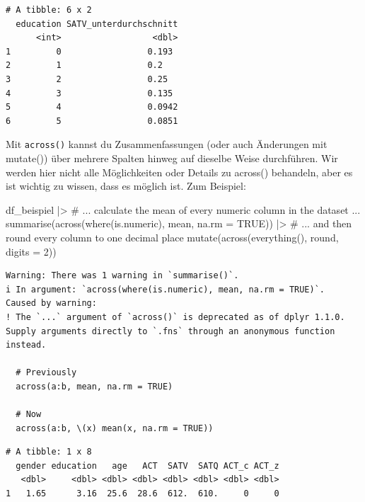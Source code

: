 \documentclass[
  letterpaper,
  DIV=11,
  numbers=noendperiod]{scrreprt}
\newenvironment{Shaded}{\begin{snugshade}}{\end{snugshade}}
\newcommand{\AttributeTok}[1]{\textcolor[rgb]{0.40,0.45,0.13}{#1}}
\newcommand{\CommentTok}[1]{\textcolor[rgb]{0.37,0.37,0.37}{#1}}
\newcommand{\ConstantTok}[1]{\textcolor[rgb]{0.56,0.35,0.01}{#1}}
\newcommand{\DecValTok}[1]{\textcolor[rgb]{0.68,0.00,0.00}{#1}}
\newcommand{\FunctionTok}[1]{\textcolor[rgb]{0.28,0.35,0.67}{#1}}
\newcommand{\NormalTok}[1]{\textcolor[rgb]{0.00,0.23,0.31}{#1}}
\newcommand{\SpecialCharTok}[1]{\textcolor[rgb]{0.37,0.37,0.37}{#1}}
\begin{document}
\begin{verbatim}
# A tibble: 6 x 2
  education SATV_unterdurchschnitt
      <int>                  <dbl>
1         0                 0.193 
2         1                 0.2   
3         2                 0.25  
4         3                 0.135 
5         4                 0.0942
6         5                 0.0851
\end{verbatim}

Mit \texttt{across()} kannst du Zusammenfassungen (oder auch Änderungen
mit mutate()) über mehrere Spalten hinweg auf dieselbe Weise
durchführen. Wir werden hier nicht alle Möglichkeiten oder Details zu
across() behandeln, aber es ist wichtig zu wissen, dass es möglich ist.
Zum Beispiel:

\begin{Shaded}
\begin{Highlighting}[]
\NormalTok{df\_beispiel }\SpecialCharTok{|\textgreater{}} 
  \CommentTok{\# ... calculate the mean of every numeric column in the dataset ...}
  \FunctionTok{summarise}\NormalTok{(}\FunctionTok{across}\NormalTok{(}\FunctionTok{where}\NormalTok{(is.numeric), mean, }\AttributeTok{na.rm =} \ConstantTok{TRUE}\NormalTok{)) }\SpecialCharTok{|\textgreater{}} 
  \CommentTok{\# ... and then round every column to one decimal place}
  \FunctionTok{mutate}\NormalTok{(}\FunctionTok{across}\NormalTok{(}\FunctionTok{everything}\NormalTok{(), round, }\AttributeTok{digits =} \DecValTok{2}\NormalTok{))}
\end{Highlighting}
\end{Shaded}

\begin{verbatim}
Warning: There was 1 warning in `summarise()`.
i In argument: `across(where(is.numeric), mean, na.rm = TRUE)`.
Caused by warning:
! The `...` argument of `across()` is deprecated as of dplyr 1.1.0.
Supply arguments directly to `.fns` through an anonymous function instead.

  # Previously
  across(a:b, mean, na.rm = TRUE)

  # Now
  across(a:b, \(x) mean(x, na.rm = TRUE))
\end{verbatim}

\begin{verbatim}
# A tibble: 1 x 8
  gender education   age   ACT  SATV  SATQ ACT_c ACT_z
   <dbl>     <dbl> <dbl> <dbl> <dbl> <dbl> <dbl> <dbl>
1   1.65      3.16  25.6  28.6  612.  610.     0     0
\end{verbatim}

\end{document}

